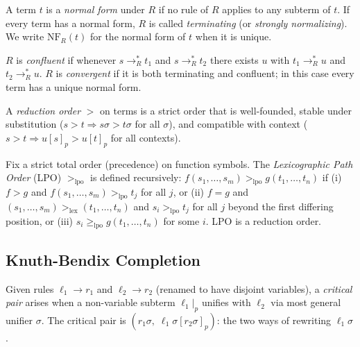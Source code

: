 \begin{definition}
A term $t$ is a \emph{normal form} under $R$ if no rule of $R$ applies to any
subterm of $t$.  If every term has a normal form, $R$ is called \emph{terminating}
(or \emph{strongly normalizing}).  We write $\mathrm{NF}_R(t)$ for the normal
form of $t$ when it is unique.
\end{definition}

\begin{definition}
$R$ is \emph{confluent} if whenever $s \to_R^* t_1$ and $s \to_R^* t_2$ there
exists $u$ with $t_1 \to_R^* u$ and $t_2 \to_R^* u$.  $R$ is \emph{convergent}
if it is both terminating and confluent; in this case every term has a unique normal
form.
\end{definition}

\begin{definition}
A \emph{reduction order} $>$ on terms is a strict order that is well-founded,
stable under substitution ($s > t \Rightarrow s\sigma > t\sigma$ for all $\sigma$),
and compatible with context ($s > t \Rightarrow u[s]_p > u[t]_p$ for all contexts).
\end{definition}

\begin{definition}
Fix a strict total order (precedence) on function symbols.  The \emph{Lexicographic
Path Order} (LPO) $>_{\mathrm{lpo}}$ is defined recursively: $f(s_1,\ldots,s_m)
>_{\mathrm{lpo}} g(t_1, \ldots, t_n)$ if (i) $f > g$ and $f(s_1,\ldots,s_m) >_{\mathrm{lpo}} t_j$
for all $j$, or (ii) $f = g$ and $(s_1,\ldots,s_m) >_{\mathrm{lex}} (t_1,\ldots,t_n)$
and $s_i >_{\mathrm{lpo}} t_j$ for all $j$ beyond the first differing position,
or (iii) $s_i \geq_{\mathrm{lpo}} g(t_1,\ldots,t_n)$ for some $i$.  LPO is a
reduction order.
\end{definition}

\subsection{Knuth-Bendix Completion}

\begin{definition}
Given rules $\ell_1 \to r_1$ and $\ell_2 \to r_2$ (renamed to have disjoint
variables), a \emph{critical pair} arises when a non-variable subterm $\ell_1|_p$
unifies with $\ell_2$ via most general unifier $\sigma$.  The critical pair is
$(r_1\sigma,\; \ell_1\sigma[r_2\sigma]_p)$: the two ways of rewriting $\ell_1\sigma$.
\end{definition}

